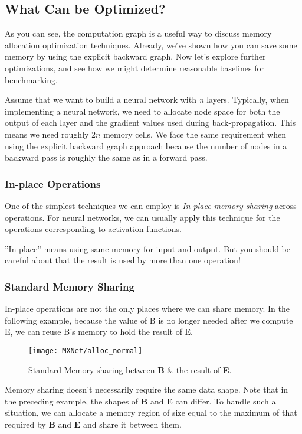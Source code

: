 \subsection{What Can be Optimized?}
As you can see, the computation graph is a useful way to discuss memory allocation optimization techniques. Already, we’ve shown how you can save some memory by using the explicit backward graph. Now let’s explore further optimizations, and see how we might determine reasonable baselines for benchmarking.

Assume that we want to build a neural network with \textit{n} layers. Typically, when implementing a neural network, we need to allocate node space for both the output of each layer and the gradient values used during back-propagation. This means we need roughly $2n$ memory cells. We face the same requirement when using the explicit backward graph approach because the number of nodes in a backward pass is roughly the same as in a forward pass.

\subsubsection{In-place Operations}
One of the simplest techniques we can employ is \textit{In-place memory sharing} across operations. For neural networks, we can usually apply this technique for the operations corresponding to activation functions. 

''In-place'' means using same memory for input and output. But you should be careful about that the result is used by more than one operation! 

\subsubsection{Standard Memory Sharing}
In-place operations are not the only places where we can share memory. In the following example, because the value of B is no longer needed after we compute E, we can reuse B’s memory to hold the result of E.
\begin{figure}[!hbtp]
\centering
\texttt{[image: MXNet/alloc\_normal]}
\caption{Standard Memory sharing between \textbf{B} \& the result of \textbf{E}.}
\end{figure}

Memory sharing doesn't necessarily require the same data shape. Note that in the preceding example, the shapes of \textbf{B} and \textbf{E} can differ. To handle such a situation, we can allocate a memory region of size equal to the maximum of that required by \textbf{B} and \textbf{E} and share it between them.

